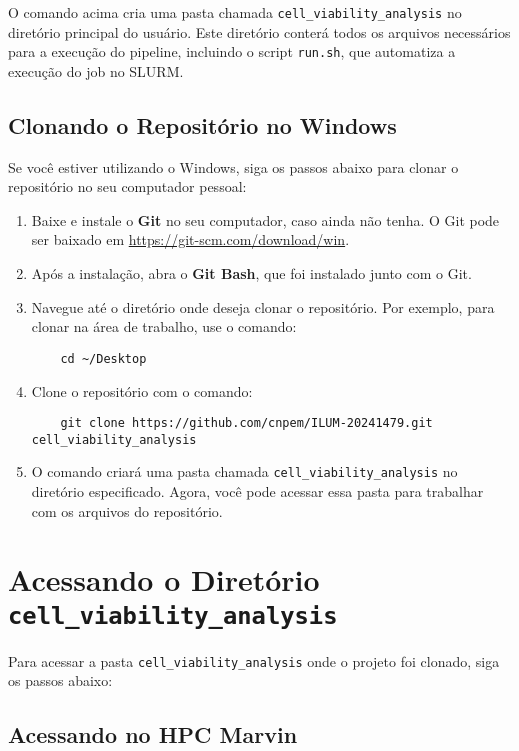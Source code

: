 \documentclass[a4paper, 12pt]{article}
\begin{document}
O comando acima cria uma pasta chamada \texttt{cell\_viability\_analysis} no diretório principal do usuário. Este diretório conterá todos os arquivos necessários para a execução do pipeline, incluindo o script \texttt{run.sh}, que automatiza a execução do job no SLURM.

\subsection{Clonando o Repositório no Windows}

Se você estiver utilizando o Windows, siga os passos abaixo para clonar o repositório no seu computador pessoal:

\begin{enumerate}
    \item Baixe e instale o \textbf{Git} no seu computador, caso ainda não tenha. O Git pode ser baixado em \url{https://git-scm.com/download/win}.
    \item Após a instalação, abra o \textbf{Git Bash}, que foi instalado junto com o Git.
    \item Navegue até o diretório onde deseja clonar o repositório. Por exemplo, para clonar na área de trabalho, use o comando:
    \begin{verbatim}
    cd ~/Desktop
    \end{verbatim}
    \item Clone o repositório com o comando:
    \begin{verbatim}
    git clone https://github.com/cnpem/ILUM-20241479.git cell_viability_analysis
    \end{verbatim}
    \item O comando criará uma pasta chamada \texttt{cell\_viability\_analysis} no diretório especificado. Agora, você pode acessar essa pasta para trabalhar com os arquivos do repositório.
\end{enumerate}


\section{Acessando o Diretório \texttt{cell\_viability\_analysis}}

Para acessar a pasta \texttt{cell\_viability\_analysis} onde o projeto foi clonado, siga os passos abaixo:

\subsection{Acessando no HPC Marvin}
\end{document}
